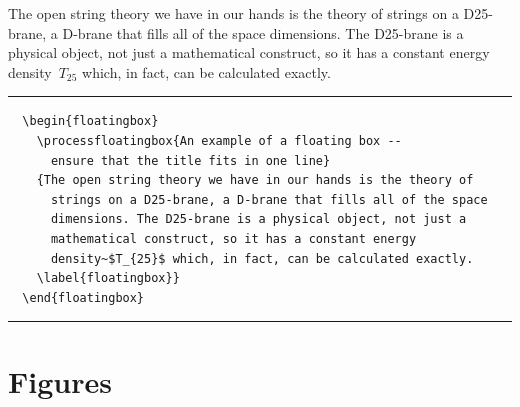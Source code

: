   \begin{floatingbox}
    {The open string theory we have in our hands is the theory of
      strings on a D25-brane, a D-brane that fills all of the space
      dimensions. The D25-brane is a physical object, not just a
      mathematical construct, so it has a constant energy
      density~$T_{25}$ which, in fact, can be calculated exactly.
    \label{floatingbox}}
  \rule[-20pt]{\textwidth}{0.5pt}
\begin{verbatim}
  \begin{floatingbox}
    \processfloatingbox{An example of a floating box --
      ensure that the title fits in one line}
    {The open string theory we have in our hands is the theory of
      strings on a D25-brane, a D-brane that fills all of the space
      dimensions. The D25-brane is a physical object, not just a
      mathematical construct, so it has a constant energy
      density~$T_{25}$ which, in fact, can be calculated exactly.
    \label{floatingbox}}
  \end{floatingbox}
\end{verbatim}
  \rule[20pt]{\textwidth}{0.5pt}
  \end{floatingbox}

\section{Figures}

